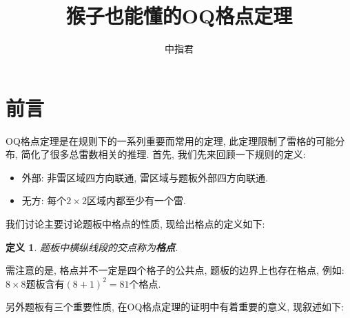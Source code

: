\documentclass{ctexart}
\title{猴子也能懂的OQ格点定理}
\author{中指君}
\newcommand{\varible}[1]{{\Noto[#1]}}
\newtheorem{definition}{定义}
\begin{document}
\maketitle
\tableofcontents
\pagebreak
\section{前言}
OQ格点定理是在\varible{O}\varible{Q}规则下的一系列重要而常用的定理, 此定理限制了雷格的可能分布, 简化了很多总雷数相关的推理.
首先, 我们先来回顾一下\varible{O}\varible{Q}规则的定义:
\begin{itemize}
    \item \varible{O}{\heiti 外部: 非雷区域四方向联通, 雷区域与题板外部四方向联通.}
    \item \varible{Q}{\heiti 无方: 每个$2\times2$区域内都至少有一个雷.}
\end{itemize}

我们讨论主要讨论题板中格点的性质, 现给出格点的定义如下:
\begin{definition}
    题板中横纵线段的交点称为\textbf{格点}.
\end{definition}
需注意的是, 格点并不一定是四个格子的公共点, 题板的边界上也存在格点, 例如: $8\times8$题板含有$(8+1)^2 = 81$个格点.

另外\varible{O}\varible{Q}题板有三个重要性质, 在OQ格点定理的证明中有着重要的意义, 现叙述如下:
\end{document}
